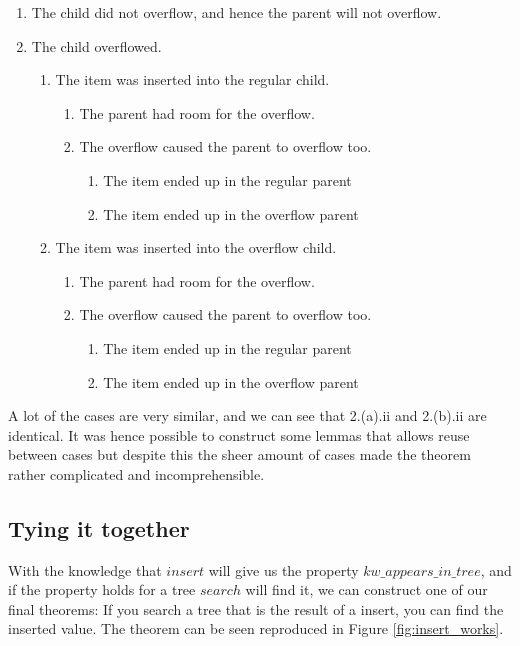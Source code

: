 \begin{enumerate}
  \item The child did not overflow, and hence the parent will not overflow. 
  \item The child overflowed.
  \begin{enumerate}
    \item The item was inserted into the regular child.
    \begin{enumerate}
      \item The parent had room for the overflow.
      \item The overflow caused the parent to overflow too.
      \begin{enumerate}
        \item The item ended up in the regular parent
        \item The item ended up in the overflow parent
      \end{enumerate}
    \end{enumerate}
    \item The item was inserted into the overflow child.
    \begin{enumerate}
      \item The parent had room for the overflow.
      \item The overflow caused the parent to overflow too.
      \begin{enumerate}
        \item The item ended up in the regular parent
        \item The item ended up in the overflow parent
      \end{enumerate}
    \end{enumerate}
  \end{enumerate}
\end{enumerate}

A lot of the cases are very similar, and we can see that 2.(a).ii and 2.(b).ii are identical. It was hence possible to construct some lemmas that allows reuse between cases but despite this the sheer amount of cases made the theorem rather complicated and incomprehensible. 

\subsection{Tying it together}

With the knowledge that $insert$ will give us the property $kw\_appears\_in\_tree$, and if the property holds for a tree $search$ will find it, we can construct one of our final theorems: If you search a tree that is the result of a insert, you can find the inserted value. The theorem can be seen reproduced in Figure \ref{fig:insert_works}.

